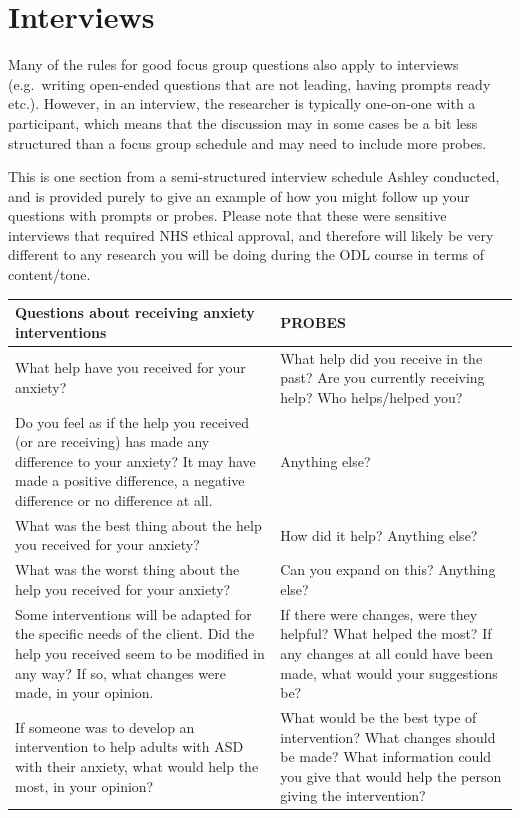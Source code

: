 \documentclass[
  english,
  letterpaper,
  DIV=11,
  numbers=noendperiod]{scrreprt}
\begin{document}
\section{Interviews}\label{interviews}

Many of the rules for good focus group questions also apply to
interviews (e.g.~writing open-ended questions that are not leading,
having prompts ready etc.). However, in an interview, the researcher is
typically one-on-one with a participant, which means that the discussion
may in some cases be a bit less structured than a focus group schedule
and may need to include more probes.

This is one section from a semi-structured interview schedule Ashley
conducted, and is provided purely to give an example of how you might
follow up your questions with prompts or probes. Please note that these
were sensitive interviews that required NHS ethical approval, and
therefore will likely be very different to any research you will be
doing during the ODL course in terms of content/tone.

\begin{longtable}[]{@{}
  >{\raggedright\arraybackslash}p{}
  >{\raggedright\arraybackslash}p{}@{}}
\toprule\noalign{}
\begin{minipage}[b]{\linewidth}\raggedright
Questions about receiving anxiety interventions
\end{minipage} & \begin{minipage}[b]{\linewidth}\raggedright
PROBES
\end{minipage} \\
\midrule\noalign{}
\endhead
\bottomrule\noalign{}
\endlastfoot
What help have you received for your anxiety? & What help did you
receive in the past? Are you currently receiving help? Who helps/helped
you? \\
Do you feel as if the help you received (or are receiving) has made any
difference to your anxiety? It may have made a positive difference, a
negative difference or no difference at all. & Anything else? \\
What was the best thing about the help you received for your anxiety? &
How did it help? Anything else? \\
What was the worst thing about the help you received for your anxiety? &
Can you expand on this? Anything else? \\
Some interventions will be adapted for the specific needs of the client.
Did the help you received seem to be modified in any way? If so, what
changes were made, in your opinion. & If there were changes, were they
helpful? What helped the most? If any changes at all could have been
made, what would your suggestions be? \\
If someone was to develop an intervention to help adults with ASD with
their anxiety, what would help the most, in your opinion? & What would
be the best type of intervention? What changes should be made? What
information could you give that would help the person giving the
intervention? \\
\end{longtable}
\end{document}
